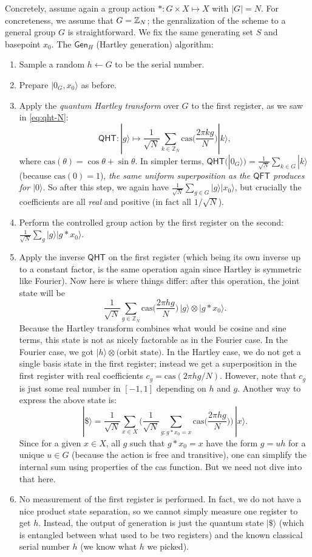 \documentclass[12pt]{report}
\newcommand{\cas}{\mathrm{cas}}
\newcommand{\qht}{\mathsf{QHT}}
\newcommand{\qft}{\mathsf{QFT}}
\begin{document}
Concretely, assume again a group action $*: G\times X \mapsto X$ with $|G|=N$. For concreteness, we assume that $G = \mathbb{Z}_N$; the genralization of the scheme to a general group $G$ is straightforward. We fix the same generating set $S$ and basepoint $x_0$. The $\mathsf{Gen}_{H}$ (Hartley generation) algorithm:
\begin{enumerate}
    \item Sample a random $h \leftarrow G$ to be the serial number.
    \item Prepare $|0_G, x_0\rangle$ as before.
    \item Apply the \emph{quantum Hartley transform} over $G$ to the first register, as we saw in \ref{eq:qht-N}:
    \[
       \qht: |g\rangle \mapsto \frac{1}{\sqrt{N}} \sum_{k \in \mathbb{Z}_N} \cas \Big(\frac{2\pi  kg }{N}\Big) |k\rangle,
    \] 
    where $\mathrm{cas}(\theta) = \cos \theta + \sin \theta$. In simpler terms, $\qht(|0_G\rangle) = \frac{1}{\sqrt{N}}\sum_{k \in G} |k\rangle$ (because $\cas(0)=1$), \emph{the same uniform superposition as the $\qft$ produces for $|0\rangle$}. So after this step, we again have $\frac{1}{\sqrt{N}}\sum_{g \in G} |g\rangle|x_0\rangle$, but crucially the coefficients are all \emph{real} and positive (in fact all $1/\sqrt{N}$).
    \item Perform the controlled group action by the first register on the second: $\frac{1}{\sqrt{N}}\sum_{g} |g\rangle |g*x_0\rangle$.
    \item Apply the inverse $\qht$ on the first register (which being its own inverse up to a constant factor, is the same operation again since Hartley is symmetric like Fourier). Now here is where things differ: after this operation, the joint state will be 
    \[
       \frac{1}{\sqrt{N}} \sum_{g \in \mathbb{Z}_N} \cas\Big(\frac{2\pi hg}{N}\Big)\, |g\rangle \otimes |g*x_0\rangle.
    \] 
    Because the Hartley transform combines what would be cosine and sine terms, this state is not as nicely factorable as in the Fourier case. In the Fourier case, we got $|h\rangle \otimes \text{(orbit state)}$. In the Hartley case, we do not get a single basis state in the first register; instead we get a superposition in the first register with real coefficients $c_g = \cas(2\pi hg/N)$. However, note that $c_g$ is just some real number in $[-1,1]$ depending on $h$ and $g$. Another way to express the above state is:
    \[
      |\$\rangle = \frac{1}{\sqrt{N}} \sum_{x \in X} \Big(\frac{1}{\sqrt{N}}\sum_{g: g*x_0 = x} \cas\big(\frac{2\pi  hg}{N}\big)\Big)\, |x\rangle.
    \] 
    Since for a given $x\in X$, all $g$ such that $g*x_0=x$ have the form $g = u h$ for a unique $u \in G$ (because the action is free and transitive), one can simplify the internal sum using properties of the cas function. But we need not dive into that here.
    \item No measurement of the first register is performed. In fact, we do not have a nice product state separation, so we cannot simply measure one register to get $h$. Instead, the output of generation is just the quantum state $|\$\rangle$ (which is entangled between what used to be two registers) and the known classical serial number $h$ (we know what $h$ we picked).
\end{enumerate}
\end{document}
